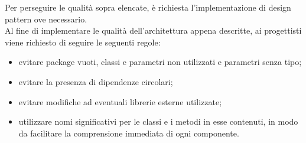 Per perseguire le qualità sopra elencate, è richiesta l'implementazione di design pattern ove necessario.\\
Al fine di implementare le qualità dell'architettura appena descritte, ai progettisti viene richiesto di seguire le seguenti regole: \begin{itemize}
\item evitare package vuoti, classi e parametri non utilizzati e parametri senza tipo;
\item evitare la presenza di dipendenze circolari;
\item evitare modifiche ad eventuali librerie esterne utilizzate;
\item utilizzare nomi significativi per le classi e i metodi in esse contenuti, in modo da facilitare la comprensione immediata di ogni componente.
\end{itemize}
